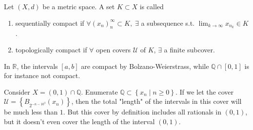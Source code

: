 \begin{definition}[Compactness]\label{def:compactness}
	Let $(X,d)$ be a metric space. A set $K \subset X$ is called
	\begin{enumerate}
		\item sequentially compact if $\forall (x_{n})_{n}^{\infty} \subset K, \; \exists$ a subsequence s.t. $\lim_{k \to \infty} x_{n_{k}} \in K$.
		\item topologically compact if $\forall$ open covers $\mathcal{U}$ of $K$, $\exists$ a finite subcover.
	\end{enumerate}
\end{definition}

\begin{eg}
	In $\mathbb{R}$, the intervals $[a,b]$ are compact by Bolzano-Weierstrass, while $\mathbb{Q} \cap [0,1]$ is for instance not compact.

	Consider $X = (0,1) \cap \mathbb{Q}$. Enumerate $\mathbb{Q} \subset \left\{ x_{n} \mid n \geq 0 \right\}$. If we let the cover $\mathcal{U} = \left\{ B_{2^{-n-10^{3}}}(x_{n}) \right\}$, then the total "length" of the intervals in this cover will be much less than $1$. But this cover by definition includes all rationals in $(0,1)$, but it doesn't even cover the length of the interval $(0,1)$.
\end{eg}

